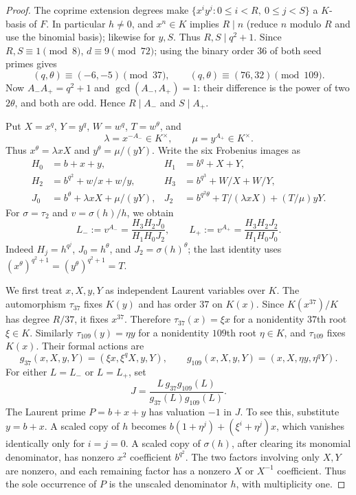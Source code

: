 \documentclass[11pt]{article}
\theoremstyle{definition}
\theoremstyle{remark}
\begin{document}
\begin{proof}
The coprime extension degrees make $\{x^i y^j:0\leq i<R,\ 0\leq j<S\}$
a $K$-basis of $F$. In particular $h\ne0$, and $x^n\in K$ implies
$R\mid n$ (reduce $n$ modulo $R$ and use the binomial basis); likewise
for $y,S$. Thus $R,S\mid q^2+1$. Since $R,S\equiv1\pmod8$,
$d\equiv9\pmod{72}$; using the binary order $36$ of both seed primes gives
\[
 (q,\theta)\equiv(-6,-5)\pmod{37},\qquad
 (q,\theta)\equiv(76,32)\pmod{109}.
\]
Now $A_-A_+=q^2+1$ and $\gcd(A_-,A_+)=1$: their difference is the power
of two $2\theta$, and both are odd. Hence $R\mid A_-$ and $S\mid A_+$.

Put $X=x^q$, $Y=y^q$, $W=w^q$, $T=w^\theta$, and
\[
 \lambda=x^{-A_-}\in K^\times,\qquad
 \mu=y^{A_+}\in K^\times.
\]
Thus $x^\theta=\lambda xX$ and $y^\theta=\mu/(yY)$. Write the six Frobenius images as
\begin{align*}
 H_0&=b+x+y,& H_1&=b^q+X+Y,\\
 H_2&=b^{q^2}+w/x+w/y,& H_3&=b^{q^3}+W/X+W/Y,\\
 J_0&=b^\theta+\lambda xX+\mu/(yY),&
 J_2&=b^{q^2\theta}+T/(\lambda xX)+(T/\mu)yY.
\end{align*}
For $\sigma=\tau_2$ and $v=\sigma(h)/h$, we obtain
\[
 L_-:=v^{A_-}=\frac{H_3H_2J_0}{H_1H_0J_2},\qquad
 L_+:=v^{A_+}=\frac{H_3H_2J_2}{H_1H_0J_0}.
\]
Indeed $H_j=h^{q^j}$, $J_0=h^\theta$, and $J_2=\sigma(h)^\theta$;
the last identity uses
$(x^\theta)^{q^2+1}=(y^\theta)^{q^2+1}=T$.

We first treat $x,X,y,Y$ as independent Laurent variables over $K$.
The automorphism $\tau_{37}$ fixes $K(y)$ and has order $37$ on $K(x)$.
Since $K(x^{37})/K$ has degree $R/37$, it fixes $x^{37}$. Therefore
$\tau_{37}(x)=\xi x$ for a nonidentity $37$th root $\xi\in K$.
Similarly $\tau_{109}(y)=\eta y$ for a nonidentity $109$th root
$\eta\in K$, and $\tau_{109}$ fixes $K(x)$. Their formal actions are
\[
 g_{37}(x,X,y,Y)=(\xi x,\xi^qX,y,Y),\qquad
 g_{109}(x,X,y,Y)=(x,X,\eta y,\eta^qY).
\]
For either $L=L_-$ or $L=L_+$, set
\[
             J=\frac{L\,g_{37}g_{109}(L)}{g_{37}(L)g_{109}(L)}.
\]
The Laurent prime $P=b+x+y$ has valuation $-1$ in $J$. To see this,
substitute $y=b+x$. A scaled copy of $h$ becomes
$b(1+\eta^j)+(\xi^i+\eta^j)x$, which vanishes identically only for
$i=j=0$. A scaled copy of $\sigma(h)$, after clearing its monomial
denominator, has nonzero $x^2$ coefficient $b^{q^2}$. The two factors involving
only $X,Y$ are nonzero, and each remaining factor has a nonzero
$X$ or $X^{-1}$ coefficient. Thus the sole occurrence of $P$ is the
unscaled denominator $h$, with multiplicity one.


\end{proof}
\end{document}
